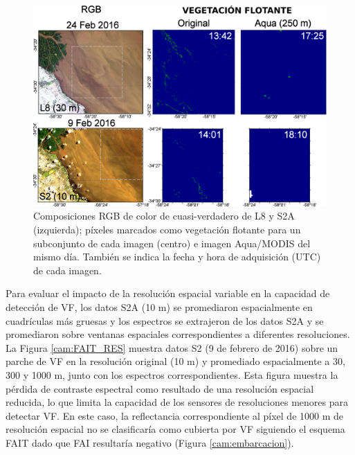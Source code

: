         \begin{figure}
        \centering
        \includegraphics[width=\textwidth]{cam/figures/FAIT_L8S2.png}
        \caption[Composiciones RGB de L8, S2A y Aqua/MODIS e imagen binaria indicando los píxeles con vegetación flotante.]{Composiciones RGB de color de cuasi-verdadero de L8 y S2A (izquierda); píxeles marcados como vegetación flotante para un subconjunto de cada imagen (centro) e imagen Aqua/MODIS del mismo día. También se indica la fecha y hora de adquisición (UTC) de cada imagen.}
        \label{cam:FAIT_L8S2}
        \end{figure}
        
        Para evaluar el impacto de la resolución espacial variable en la capacidad de detección de VF, los datos S2A (10 m) se promediaron espacialmente en cuadrículas más gruesas y los espectros se extrajeron de los datos S2A y se promediaron sobre ventanas espaciales correspondientes a diferentes resoluciones. La Figura \ref{cam:FAIT_RES} muestra datos S2 (9 de febrero de 2016) sobre un parche de VF en la resolución original (10 m) y promediado espacialmente a 30, 300 y 1000 m, junto con los espectros correspondientes. Esta figura muestra la pérdida de contraste espectral como resultado de una resolución espacial reducida, lo que limita la capacidad de los sensores de resoluciones menores para detectar VF. En este caso, la reflectancia correspondiente al píxel de 1000 m de resolución espacial no se clasificaría como cubierta por VF siguiendo el esquema FAIT dado que FAI resultaría negativo (Figura \ref{cam:embarcacion}).
        
